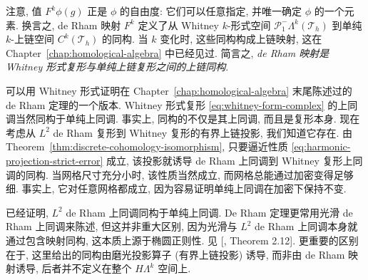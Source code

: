 {注意, 值 $F^k\phi(g)$ 正是 $\phi$ 的自由度: 它们可以任意指定, 并唯一确定 $\phi$ 的一个元素. 换言之, de Rham 映射 $F^k$ 定义了从 Whitney $k$-形式空间 $\mathcal P_1^-\Lambda^k(\mathcal T_h)$ 到单纯 $k$-上链空间 $C^k(\mathcal T_h)$ 的同构. 当 $k$ 变化时, 这些同构构成上链映射, 这在 Chapter~\ref{chap:homological-algebra} 中已经见过. 简言之, \emph{de Rham 映射是 Whitney 形式复形与单纯上链复形之间的上链同构}.}

{可以用 Whitney 形式证明在 Chapter~\ref{chap:homological-algebra} 末尾陈述过的 de Rham 定理的一个版本. Whitney 形式复形 \eqref{eq:whitney-form-complex} 的上同调当然同构于单纯上同调. 事实上, 同构的不仅是其上同调, 而且是复形本身. 现在考虑从 $L^2$ de Rham 复形到 Whitney 复形的有界上链投影, 我们知道它存在. 由 Theorem~\ref{thm:discrete-cohomology-isomorphism}, 只要逼近性质 \eqref{eq:harmonic-projection-strict-error} 成立, 该投影就诱导 de Rham 上同调到 Whitney 复形上同调的同构. 当网格尺寸充分小时, 该性质当然成立, 而网格总能通过加密变得足够细. 事实上, 它对任意网格都成立, 因为容易证明单纯上同调在加密下保持不变.}


\begin{Remark}\label{rem:de-rham-cohomology-isomorphism}
{已经证明, $L^2$ de Rham 上同调同构于单纯上同调. De Rham 定理更常用光滑 de Rham 上同调来陈述, 但这并非重大区别, 因为光滑与 $L^2$ de Rham 上同调本身就通过包含映射同构, 这本质上源于椭圆正则性. 见 [, Theorem 2.12]. 更重要的区别在于, 这里给出的同构由磨光投影算子 (有界上链投影) 诱导, 而非由 de Rham 映射诱导, 后者并不定义在整个 $H\Lambda^k$ 空间上.}
\end{Remark}

